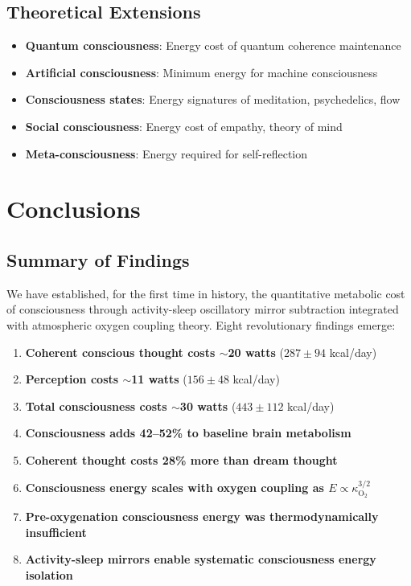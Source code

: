 \documentclass[12pt,twocolumn]{article}
\theoremstyle{remark}
\begin{document}
\subsection{Theoretical Extensions}

\begin{itemize}
\item \textbf{Quantum consciousness}: Energy cost of quantum coherence maintenance
\item \textbf{Artificial consciousness}: Minimum energy for machine consciousness
\item \textbf{Consciousness states}: Energy signatures of meditation, psychedelics, flow
\item \textbf{Social consciousness}: Energy cost of empathy, theory of mind
\item \textbf{Meta-consciousness}: Energy required for self-reflection
\end{itemize}

\section{Conclusions}

\subsection{Summary of Findings}

We have established, for the first time in history, the quantitative metabolic cost of consciousness through activity-sleep oscillatory mirror subtraction integrated with atmospheric oxygen coupling theory. Eight revolutionary findings emerge:

\begin{enumerate}
\item \textbf{Coherent conscious thought costs $\sim$20 watts} ($287 \pm 94$ kcal/day)
\item \textbf{Perception costs $\sim$11 watts} ($156 \pm 48$ kcal/day)
\item \textbf{Total consciousness costs $\sim$30 watts} ($443 \pm 112$ kcal/day)
\item \textbf{Consciousness adds 42--52\% to baseline brain metabolism}
\item \textbf{Coherent thought costs 28\% more than dream thought}
\item \textbf{Consciousness energy scales with oxygen coupling as $E \propto \kappa_{\text{O}_2}^{3/2}$}
\item \textbf{Pre-oxygenation consciousness energy was thermodynamically insufficient}
\item \textbf{Activity-sleep mirrors enable systematic consciousness energy isolation}
\end{enumerate}
\end{document}
